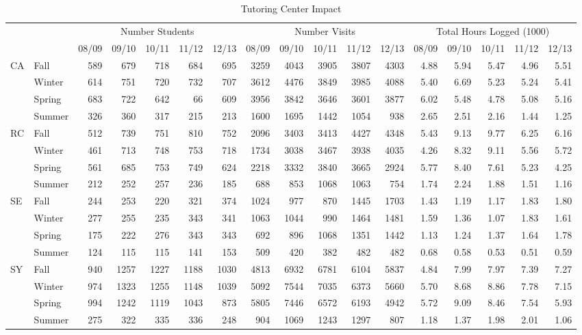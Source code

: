 \afterpage{\global\pdfpageattr\expandafter{\the\pdfpageattr/Rotate 90}} 

\clearpage

\begin{sidewaystable}[!h]
\centering
\caption{Tutoring Center Impact}\label{app:tut:tab:SLC}
\begin{tabular}{llrrrrrrrrrrrrrrr}
\toprule
&&\multicolumn{5}{c|}{Number Students}&\multicolumn{5}{c|}{Number Visits}&\multicolumn{5}{c}{Total Hours Logged (1000)}\\
&& 08/09 & 09/10 & 10/11 & 11/12 & 12/13 & 08/09 & 09/10 & 10/11 & 11/12 & 12/13 & 08/09 & 09/10 & 10/11 & 11/12 & 12/13\\
\midrule
\multirow{4}{*}{CA}		&Fall&		589	&679	&718	&684	&695&	3259&4043&3905&3807&	4303&	4.88&5.94&5.47&4.96&5.51\\
					&Winter&		614	&751	&720	&732	&707&	3612&4476&3849&3985&	4088&	5.40&6.69&5.23&5.24&5.41\\
					&Spring&		683	&722&642&66&609&	3956&3842&3646&3601&	3877&	6.02&5.48&4.78&5.08&5.16\\
					&Summer&	326	&360&317&215&213&	1600&1695&1442&1054&	938&		2.65&2.51&2.16&1.44&1.25\\
\midrule
\multirow{4}{*}{RC}		&Fall&		512&	739&	751&	810&	752&		2096&3403&3413&4427&	4348&	5.43&9.13&9.77&6.25&6.16\\
					&Winter&		461&	713&	748&	753&	718&		1734&3038&3467&3938&	4035&	4.26&8.32&9.11&5.56&5.72\\
					&Spring&		561&	685&	753&	749&	624&		2218&3332&3840&3665&	2924&	5.77&8.40&7.61&5.23&4.25\\
					&Summer&	212&	252&	257&	236&	185&		688&	853&	1068&1063&	754&		1.74&2.24&1.88&1.51&1.16\\
\midrule
\multirow{4}{*}{SE}		&Fall	&		244&	253&	220&	321&	374&		1024&977&870&1445&	1703&	1.43&1.19&1.17&1.83&1.80\\
					&Winter&		277&	255&	235&	343&	341&		1063&1044&990&1464&	1481&	1.59&1.36&1.07&1.83&1.61\\
					&Spring&		175&	222&	276&	343&	343&		692&	896&	1068&1351&	1442&	1.13&1.24&1.37&1.64&1.78\\
					&Summer&	124&	115&	115&	141&	153&		509&	420&	382&	482&482&			0.68&0.58&0.53&0.51&0.59\\
\midrule
\multirow{4}{*}{SY}		&Fall&		940&	1257&1227&1188&1030&	4813&6932&6781&6104&	5837&	4.84&7.99&7.97&7.39&7.27\\
					&Winter&		974&	1323&1255&1148&1039&	5092&7544&7035&6373&	5660&	5.70&8.68&8.86&7.78&7.15\\
					&Spring&		994&	1242&1119&1043&873&	5805&7446&6572&6193&	4942&	5.72&9.09&8.46&7.54&5.93\\
					&Summer&	275&	322&	335&	336&	248&		904&1069&1243&1297&807&		1.18&1.37&1.98&2.01&1.06\\
\bottomrule
\end{tabular}
\end{sidewaystable}


\afterpage{\global\pdfpageattr\expandafter{\the\pdfpageattr/Rotate 0}}

